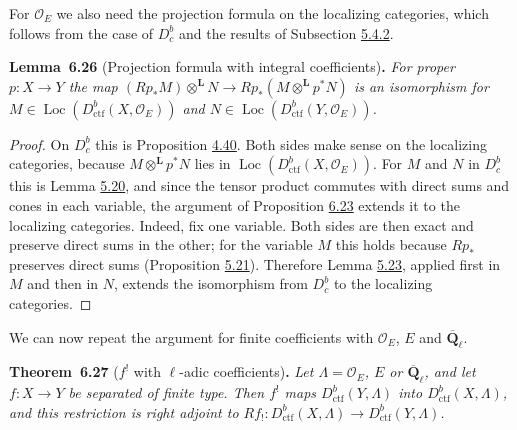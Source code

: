 \documentclass[11pt]{article}
\newenvironment{bpstatement}[2]{\par\addvspace{0.6\baselineskip}\noindent\textbf{#1}#2\textbf{.}\enspace\ignorespaces}
  {\par\addvspace{0.4\baselineskip}}
\newenvironment{bpstatementit}[2]{\begin{bpstatement}{#1}{#2}\itshape\ignorespaces}{\end{bpstatement}}
\providecommand{\Dbc}{}\renewcommand{\Dbc}{D^b_c}
\providecommand{\Loc}{}\renewcommand{\Loc}{\operatorname{Loc}}
\begin{document}
\label{bp592}%
For \(\mathcal O_E\) we also need the projection formula on the localizing categories, which follows from the case of \(\Dbc\) and the results of Subsection \hyperref[bp469]{5.4.2}.

\label{bp593}%
\begin{bpstatementit}{Lemma~6.26}{ (Projection formula with integral coefficients)}
For proper \(p:X\to Y\) the map \((Rp_*M)\otimes^{\mathbf L}N\to Rp_*(M\otimes^{\mathbf L}p^*N)\) is an isomorphism for \(M\in\Loc(D^b_{\mathrm{ctf}}(X,\mathcal O_E))\) and \(N\in\Loc(D^b_{\mathrm{ctf}}(Y,\mathcal O_E))\).
\end{bpstatementit}

\begin{proof}[{Proof}]\label{bp594}%
On \(\Dbc\) this is Proposition \hyperref[bp405]{4.40}. Both sides make sense on the localizing categories, because \(M\otimes^{\mathbf L}p^*N\) lies in \(\Loc(D^b_{\mathrm{ctf}}(X,\mathcal O_E))\). For \(M\) and \(N\) in \(\Dbc\) this is Lemma \hyperref[bp474]{5.20}, and since the tensor product commutes with direct sums and cones in each variable, the argument of Proposition \hyperref[bp584]{6.23} extends it to the localizing categories. Indeed, fix one variable. Both sides are then exact and preserve direct sums in the other; for the variable \(M\) this holds because \(Rp_*\) preserves direct sums (Proposition \hyperref[bp477]{5.21}). Therefore Lemma \hyperref[bp485]{5.23}, applied first in \(M\) and then in \(N\), extends the isomorphism from \(\Dbc\) to the localizing categories.
\end{proof}

\label{bp595}%
We can now repeat the argument for finite coefficients with \(\mathcal O_E\), \(E\) and \(\overline{\mathbf Q}_\ell\).

\label{bp596}%
\begin{bpstatementit}{Theorem~6.27}{ ($f^!$ with $\ell$-adic coefficients)}
Let \(\Lambda=\mathcal O_E\), \(E\) or \(\overline{\mathbf Q}_\ell\), and let \(f:X\to Y\) be separated of finite type. Then \(f^!\) maps \(D^b_{\mathrm{ctf}}(Y,\Lambda)\) into \(D^b_{\mathrm{ctf}}(X,\Lambda)\), and this restriction is right adjoint to \(Rf_!:D^b_{\mathrm{ctf}}(X,\Lambda)\to D^b_{\mathrm{ctf}}(Y,\Lambda)\).
\end{bpstatementit}
\end{document}
